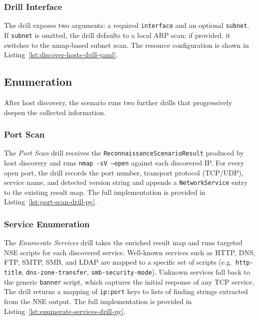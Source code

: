 \subsubsection{Drill Interface}\label{subsubsec:reconnaissance-port-discovery}

The drill exposes two arguments: a required \texttt{interface} and an optional \texttt{subnet}.
If \texttt{subnet} is omitted, the drill defaults to a local ARP scan; if provided, it switches to the nmap-based subnet scan.
The resource configuration is shown in Listing~\ref{lst:discover-hosts-drill-yaml}.

\subsection{Enumeration}\label{subsec:enumeration}

After host discovery, the scenario runs two further drills that progressively deepen the collected information.

\subsubsection{Port Scan}\label{subsubsec:port-scan}

The \textit{Port Scan} drill receives the \texttt{ReconnaissanceScenarioResult} produced by host discovery and runs \texttt{nmap -sV --open} against each discovered \gls{IP}.
For every open port, the drill records the port number, transport protocol (\gls{TCP}/\gls{UDP}), service name, and detected version string and appends a \texttt{NetworkService} entry to the existing result map.
The full implementation is provided in Listing~\ref{lst:port-scan-drill-py}.

\subsubsection{Service Enumeration}\label{subsubsec:service-enumeration}

The \textit{Enumerate Services} drill takes the enriched result map and runs targeted \gls{NSE} scripts for each discovered service.
Well-known services such as \gls{HTTP}, \gls{DNS}, \gls{FTP}, \gls{SMTP}, \gls{SMB}, and \gls{LDAP} are mapped to a specific set of scripts (e.g.\ \texttt{http-title}, \texttt{dns-zone-transfer}, \texttt{smb-security-mode}).
Unknown services fall back to the generic \texttt{banner} script, which captures the initial response of any \gls{TCP} service.
The drill returns a mapping of \texttt{ip:port} keys to lists of finding strings extracted from the \gls{NSE} output.
The full implementation is provided in Listing~\ref{lst:enumerate-services-drill-py}.

